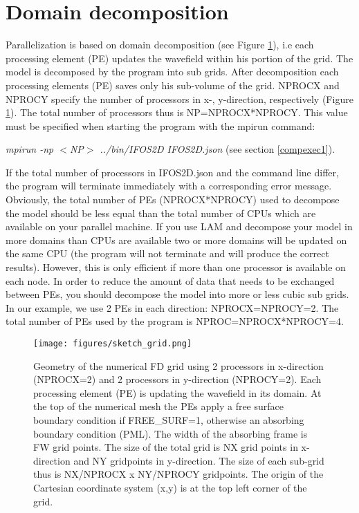 \section{Domain decomposition}
{\color{blue}{\begin{verbatim}
"Domain Decomposition" : "comment",
			"NPROCX" : "4",
			"NPROCY" : "2",
\end{verbatim}}}
Parallelization is based on domain decomposition (see Figure \ref{fig_grid_json}), i.e each processing element (PE) updates the wavefield within his portion of the grid. The model is  decomposed
by the program into sub grids. After decomposition each processing elements (PE) saves only his sub-volume of the grid. NPROCX and NPROCY specify the number of
processors in x-, y-direction, respectively (Figure  \ref{fig_grid_json}). The total number of processors thus is NP=NPROCX*NPROCY. This value must be specified when starting the program with the mpirun command:
\newline

\textit{mpirun -np $<$NP$>$ ../bin/IFOS2D IFOS2D.json} (see section \ref{compexec1}).
\newline

If the total number of processors in IFOS2D.json and the command line differ, the program will terminate immediately with a corresponding error message. Obviously, the total number of PEs (NPROCX*NPROCY) used to decompose the model  should be less equal than the total number of CPUs which are available on your parallel machine. If you use LAM and decompose your model in more domains than CPUs are available two or more  domains will be updated on the same CPU (the program will not terminate and will produce the correct results). However, this is only efficient if more than one processor is available on each node. In order to reduce the amount of data that needs to be  exchanged between PEs, you should decompose the model into more or less cubic sub grids. In our example, we use 2 PEs in each direction: NPROCX=NPROCY=2. The total number of PEs used by the program is NPROC=NPROCX*NPROCY=4. 

\begin{figure}
\begin{center}
\texttt{[image: figures/sketch\_grid.png]}
\end{center}
\caption{Geometry of the numerical FD grid using 2 processors in x-direction (NPROCX=2) and 2 processors in y-direction (NPROCY=2). Each processing element (PE) is updating the wavefield in its domain.
At the top of the numerical mesh the PEs apply a free surface boundary condition if FREE\_SURF=1, otherwise an absorbing boundary condition (PML). The width of the absorbing frame is FW grid points.  The size of the total grid is NX grid points in x-direction and NY gridpoints in y-direction. The size of each sub-grid  thus is NX/NPROCX x NY/NPROCY gridpoints. The origin of the Cartesian coordinate system (x,y) is at the top left corner of the grid.}
\label{fig_grid_json}
\end{figure}

